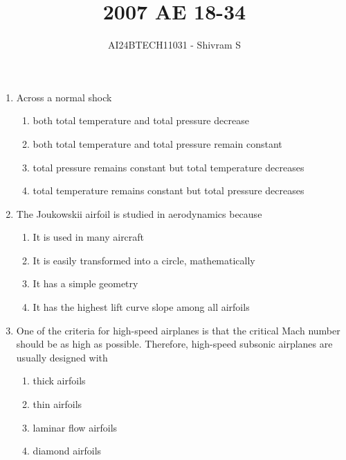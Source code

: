 \documentclass[journal]{IEEEtran}
\begin{document}

\onecolumn

\title{2007 AE 18-34}
\author{AI24BTECH11031 - Shivram S}
\maketitle
\bigskip

\renewcommand{\thefigure}{\theenumi}
\renewcommand{\thetable}{\theenumi}

\begin{enumerate}
    \item Across a normal shock
    \begin{enumerate}
        \item both total temperature and total pressure decrease
        \item both total temperature and total pressure remain constant
        \item total pressure remains constant but total temperature decreases
        \item total temperature remains constant but total pressure decreases
    \end{enumerate}

    \item The Joukowskii airfoil is studied in aerodynamics because
    \begin{enumerate}
        \item It is used in many aircraft
        \item It is easily transformed into a circle, mathematically
        \item It has a simple geometry
        \item It has the highest lift curve slope among all airfoils
    \end{enumerate}

    \item One of the criteria for high-speed airplanes is that the critical Mach number should
    be as high as possible. Therefore, high-speed subsonic airplanes are usually designed with
    \begin{multicols}{2}
        \begin{enumerate}
            \item thick airfoils
            \item thin airfoils
            \item laminar flow airfoils
            \item diamond airfoils
        \end{enumerate}
    \end{multicols}


\end{enumerate}
\end{document}
